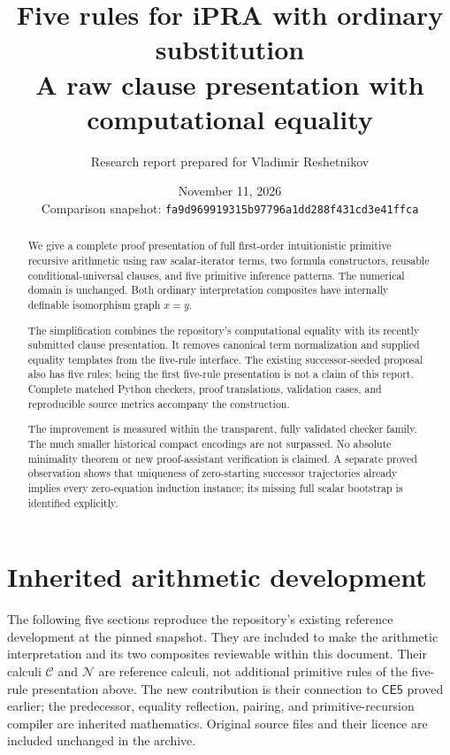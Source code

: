 \documentclass[11pt,letterpaper]{article}
\title{\textbf{Five rules for iPRA with ordinary substitution}\\[5pt]\large A raw clause presentation with computational equality}
\author{Research report prepared for Vladimir Reshetnikov}
\date{November 11, 2026\\[3pt]\small Comparison snapshot: \texttt{fa9d969919315b97796a1dd288f431cd3e41ffca}}
\theoremstyle{definition}
\newcommand{\CE}{\mathsf{CE5}}
\begin{document}
\maketitle
\begin{abstract}
We give a complete proof presentation of full first-order intuitionistic
primitive recursive arithmetic using raw scalar-iterator terms, two formula
constructors, reusable conditional-universal clauses, and five primitive
inference patterns. The numerical domain is unchanged. Both ordinary
interpretation composites have internally definable isomorphism graph
$x=y$.

The simplification combines the repository's computational equality with
its recently submitted clause presentation. It removes canonical term
normalization and supplied equality templates from the five-rule interface.
The existing successor-seeded proposal also has five rules; being the first
five-rule presentation is not a claim of this report. Complete matched
Python checkers, proof translations, validation cases, and reproducible
source metrics accompany the construction.

The improvement is measured within the transparent, fully validated checker
family. The much smaller historical compact encodings are not surpassed.
No absolute minimality theorem or new proof-assistant verification is claimed.
A separate proved observation shows that uniqueness of zero-starting
successor trajectories already implies every zero-equation induction
instance; its missing full scalar bootstrap is identified explicitly.
\end{abstract}
\clearpage
\setcounter{tocdepth}{1}
\tableofcontents
\clearpage






\clearpage

\clearpage
\appendix
\section*{Inherited arithmetic development}
The following five sections reproduce the repository's existing reference
development at the pinned snapshot. They are included to make the
arithmetic interpretation and its two composites reviewable within this
document. Their calculi $\mathcal C$ and $\mathcal N$ are reference calculi,
not additional primitive rules of the five-rule presentation above.
The new contribution is their connection to $\CE$ proved earlier; the
predecessor, equality reflection, pairing, and primitive-recursion compiler
are inherited mathematics. Original source files and their licence are
included unchanged in the archive.





\clearpage
\end{document}
